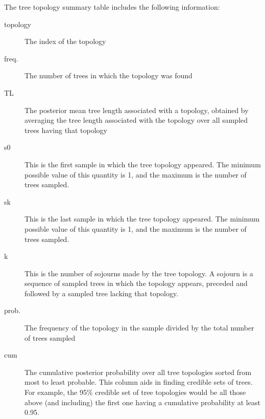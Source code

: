 \documentclass[10pt]{article}
\begin{document}
The tree topology summary table includes the following information:
\begin{description}
\item[topology] The index of the topology
\item[freq.] The number of trees in which the topology was found
\item[TL] The posterior mean tree length associated with a topology, obtained by averaging the tree length associated with the topology over all sampled trees having that topology
\item[s0] This is the first sample in which the tree topology appeared. The minimum possible value of this quantity is 1, and the maximum is the number of trees sampled.
\item[sk] This is the last sample in which the tree topology appeared. The minimum possible value of this quantity is 1, and the maximum is the number of trees sampled.
\item[k] This is the number of sojourns made by the tree topology. A sojourn is a sequence of sampled trees in which the topology appears, preceded and followed by a sampled tree lacking that topology.
\item[prob.] The frequency of the topology in the sample divided by the total number of trees sampled
\item[cum] The cumulative posterior probability over all tree topologies sorted from most to least probable. This column aids in finding credible sets of trees. For example, the 95\% credible set of tree topologies would be all those above (and including) the first one having a cumulative probability at least 0.95.
\end{description}

\end{document}

